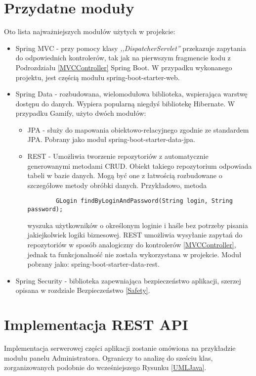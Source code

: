 \documentclass[a4paper,12pt,twoside,openany]{report}
\begin{document}
\section{Przydatne moduły}
Oto lista najważniejszych modułów użytych w projekcie:
\begin{itemize}
	\item Spring MVC - przy pomocy klasy \textit{,,DispatcherServlet''} przekazuje zapytania do odpowiednich kontrolerów, tak jak na pierwszym fragmencie kodu z Podrozdziału \ref{MVCController} Spring Boot. W przypadku wykonanego projektu, jest częścią modułu spring-boot-starter-web.
	\item Spring Data - rozbudowana, wielomodułowa biblioteka, wspierająca warstwę dostępu do danych. Wypiera popularną niegdyś bibliotekę Hibernate. W przypadku Gamify, użyto dwóch modułów:
	\begin{itemize}
		\item JPA - służy do mapowania obiektowo-relacyjnego zgodnie ze standardem JPA. Pobrany jako moduł spring-boot-starter-data-jpa.
		\item REST - Umożliwia tworzenie repozytoriów z automatycznie generowanymi metodami CRUD. Obiekt takiego repozytorium odpowiada tabeli w bazie danych. Mogą być one z łatwością rozbudowane o szczegółowe metody obróbki danych. Przykładowo, metoda 
		\begin{lstlisting}
		GLogin findByLoginAndPassword(String login, String password);
		\end{lstlisting}
		wyszuka użytkowników o określonym loginie i haśle bez potrzeby pisania jakiejkolwiek logiki biznesowej. REST umożliwia wysyłanie zapytań do repozytoriów w sposób analogiczny do kontrolerów \ref{MVCController}, jednak ta funkcjonalność nie została wykorzystana w projekcie. Moduł pobrany jako: spring-boot-starter-data-rest.
	\end{itemize}
	\item Spring Security - biblioteka zapewniająca bezpieczeństwo aplikacji, szerzej opisana w rozdziale Bezpieczeństwo \ref{Safety}.
\end{itemize}
\section{Implementacja REST API}
Implementacja serwerowej części aplikacji zostanie omówiona na przykładzie modułu panelu Administratora. Ograniczy to analizę do sześciu klas, zorganizowanych podobnie do wcześniejszego Rysunku \ref{UMLJava}.
\end{document}
